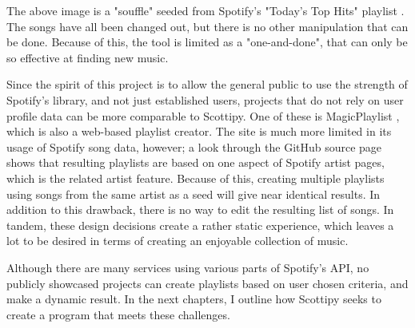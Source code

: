 The above image is a "souffle" seeded from Spotify's "Today's Top Hits" playlist
\cite{TopHits:19}. The songs have all been changed out, but there is no other
manipulation that can be done. Because of this, the tool is limited as a
"one-and-done", that can only be so effective at finding new music.


Since the spirit of this project is to allow the general public to use the strength
of Spotify's library, and not just established users, projects that do not rely on
user profile data can be more comparable to Scottipy. One of these is MagicPlaylist
\cite{Magic:15}, which is also a web-based playlist creator. The site is much more
limited in its usage of Spotify song data, however; a look through the GitHub source
page \cite{Lovera:15} shows that resulting playlists are based on one aspect of
Spotify artist pages, which is the related artist feature. Because of this,
creating multiple playlists using songs from the same artist as a seed will
give near identical results. In addition to this drawback, there is no way to
edit the resulting list of songs. In tandem, these design decisions create a
rather static experience, which leaves a lot to be desired in terms of creating
an enjoyable collection of music.

Although there are many services using various parts of Spotify's API, no publicly
showcased projects can create playlists based on user chosen criteria, and make
a dynamic result. In the next chapters, I outline how Scottipy seeks to create
a program that meets these challenges.
